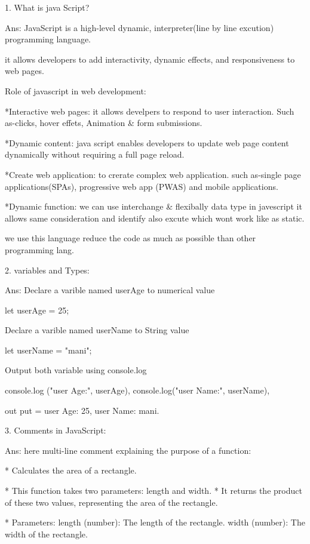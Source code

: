 1. What is java Script?

Ans:  JavaScript is a high-level dynamic, interpreter(line by line excution) programming language.

     it allows developers to add interactivity, dynamic effects, and 
     responsiveness to web pages.

Role of javascript in web development:

*Interactive web pages:
     it allows develpers to respond to user interaction.
     Such as-clicks, hover effets, Animation & form submissions.
   
*Dynamic content:
     java script enables developers to update web page content 
     dynamically without requiring a full page reload.

*Create web application:
     to crerate complex web application.
     such as-single page applications(SPAs),
     progressive web app (PWAS) and mobile applications.

*Dynamic function:
     we can use interchange & flexibally data type in javescript it allows same
     consideration and identify also excute which wont work like as static.

     we use this language reduce the code as much as possible than other 
     programming lang.

2. variables and Types:

Ans:
Declare a varible named userAge to numerical value

     let userAge = 25;

Declare a varible named userName to String value

     let userName = "mani";

Output both variable using console.log

           console.log ("user Age:", userAge),
           console.log("user Name:", userName),

out put = user Age: 25, user Name: mani.

3. Comments in JavaScript:

Ans:
here multi-line comment explaining the purpose of a function:

* Calculates the area of a rectangle.
 
* This function takes two parameters: length and width.
* It returns the product of these two values, representing the area of the rectangle.
 
* Parameters:
    length (number): The length of the rectangle.
    width (number): The width of the rectangle.

